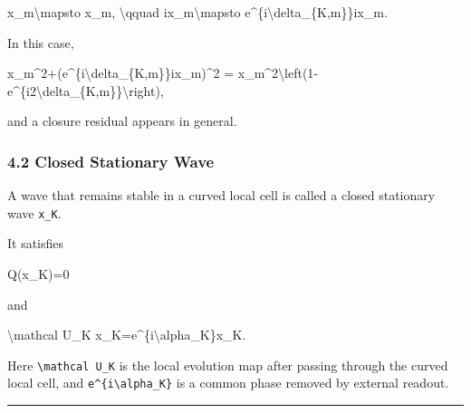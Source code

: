 \documentclass[
  a4paper,
]{article}
\newenvironment{Shaded}{}{}
\newcommand{\NormalTok}[1]{#1}
\begin{document}
\begin{Shaded}
\begin{Highlighting}[]
\NormalTok{x\_m\textbackslash{}mapsto x\_m,}
\NormalTok{\textbackslash{}qquad}
\NormalTok{ix\_m\textbackslash{}mapsto e\^{}\{i\textbackslash{}delta\_\{K,m\}\}ix\_m.}
\end{Highlighting}
\end{Shaded}

In this case,

\begin{Shaded}
\begin{Highlighting}[]
\NormalTok{x\_m\^{}2+(e\^{}\{i\textbackslash{}delta\_\{K,m\}\}ix\_m)\^{}2}
\NormalTok{=}
\NormalTok{x\_m\^{}2\textbackslash{}left(1{-}e\^{}\{i2\textbackslash{}delta\_\{K,m\}\}\textbackslash{}right),}
\end{Highlighting}
\end{Shaded}

and a closure residual appears in general.

\subsubsection{4.2 Closed Stationary Wave}\label{closed-stationary-wave}

A wave that remains stable in a curved local cell is called a closed
stationary wave \texttt{x\_K}.

It satisfies

\begin{Shaded}
\begin{Highlighting}[]
\NormalTok{Q(x\_K)=0}
\end{Highlighting}
\end{Shaded}

and

\begin{Shaded}
\begin{Highlighting}[]
\NormalTok{\textbackslash{}mathcal U\_K x\_K=e\^{}\{i\textbackslash{}alpha\_K\}x\_K.}
\end{Highlighting}
\end{Shaded}

Here \texttt{\textbackslash{}mathcal\ U\_K} is the local evolution map
after passing through the curved local cell, and
\texttt{e\^{}\{i\textbackslash{}alpha\_K\}} is a common phase removed by
external readout.

\begin{center}\rule{0.5\linewidth}{0.5pt}\end{center}
\end{document}
